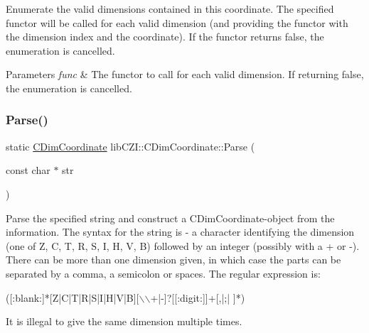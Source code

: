 Enumerate the valid dimensions contained in this coordinate. The specified functor will be called for each valid dimension (and providing the functor with the dimension index and the coordinate). If the functor returns false, the enumeration is cancelled.


\begin{DoxyParams}{Parameters}
{\em func} & The functor to call for each valid dimension. If returning false, the enumeration is cancelled. \\
\hline
\end{DoxyParams}
\mbox{\label{classlib_c_z_i_1_1_c_dim_coordinate_a684c17ad37de1e817c660e89e704d81e}} 
\subsubsection{\texorpdfstring{Parse()}{Parse()}}
{\footnotesize\ttfamily static \hyperlink{classlib_c_z_i_1_1_c_dim_coordinate}{C\+Dim\+Coordinate} lib\+C\+Z\+I\+::\+C\+Dim\+Coordinate\+::\+Parse (\begin{DoxyParamCaption}\item[{const char $\ast$}]{str }\end{DoxyParamCaption})\hspace{0.3cm}{\ttfamily [static]}}

Parse the specified string and construct a C\+Dim\+Coordinate-\/object from the information. The syntax for the string is -\/ a character identifying the dimension (one of \textquotesingle{}Z\textquotesingle{}, \textquotesingle{}C\textquotesingle{}, \textquotesingle{}T\textquotesingle{}, \textquotesingle{}R\textquotesingle{}, \textquotesingle{}S\textquotesingle{}, \textquotesingle{}I\textquotesingle{}, \textquotesingle{}H\textquotesingle{}, \textquotesingle{}V\textquotesingle{}, \textquotesingle{}B\textquotesingle{}) followed by an integer (possibly with a + or -\/). There can be more than one dimension given, in which case the parts can be separated by a comma, a semicolon or spaces. The regular expression is\+: 
\begin{DoxyCode}
([:blank:]*[Z|C|T|R|S|I|H|V|B][\(\backslash\)\(\backslash\)+|-]?[[:digit:]]+[,|;| ]*)
\end{DoxyCode}
 It is illegal to give the same dimension multiple times.


